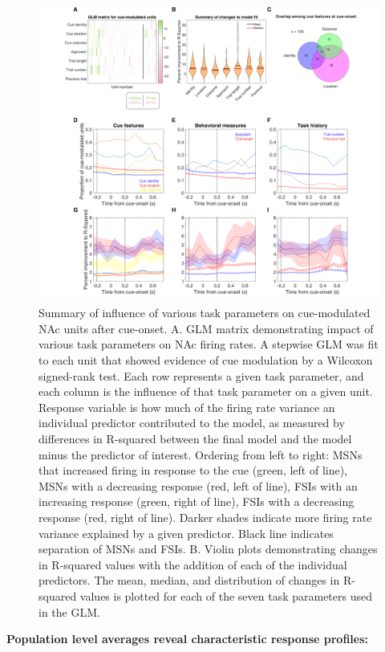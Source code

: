 \documentclass[11pt]{article}
\begin{document}
\begin{figure}[h]
\centering
\includegraphics[width=\textwidth]{Fig 6 - GLM.png}
\caption{Summary of influence of various task parameters on cue-modulated NAc units after cue-onset.  A. GLM matrix demonstrating impact of various task parameters on NAc firing rates. A stepwise GLM was fit to each unit that showed evidence of cue modulation by a Wilcoxon signed-rank test. Each row represents a given task parameter, and each column is the influence of that task parameter on a given unit. Response variable is how much of the firing rate variance an individual predictor contributed to the model, as measured by differences in R-squared between the final model and the model minus the predictor of interest. Ordering from left to right: MSNs that increased firing in response to the cue (green, left of line), MSNs with a decreasing response (red, left of line), FSIs with an increasing response (green, right of line), FSIs with a decreasing response (red, right of line). Darker shades indicate more firing rate variance explained by a given predictor. Black line indicates separation of MSNs and FSIs. B. Violin plots demonstrating changes in R-squared values with the addition of each of the individual predictors. The mean, median, and distribution of changes in R-squared values is plotted for each of the seven task parameters used in the GLM.}
\label{fig:GLM}
\end{figure}

{\bf Population level averages reveal characteristic response profiles:}
\end{document}
